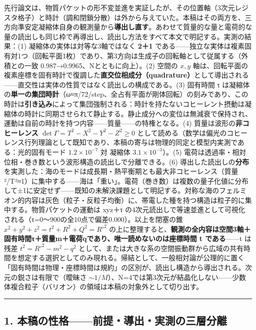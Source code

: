 \documentclass[
  a4paper,
]{ltjsarticle}
\begin{document}
先行論文は、物質パケットの形不変並進を実証したが、その位置軸（3次元レジスタ格子）と時計（調和閉鎖分散）は外から与えていた。本稿はその両方を、三方向準安定凝縮体自身の観測量から\textbf{導出し直す}。あわせて質量的な量と電荷的な量の読出しも同じ枠で再導出し、読出し方法をすべて本文で明記する。実測の結果：(1)
凝縮体の実体は対等な3軸ではなく \textbf{2＋1}
である------独立な実体は複素固有対1つ（回転平面1枚）であり、第3方向は生成子の回転軸として従属する（外積との一致
0.987→0.9965、Nとともに向上）。(2) 空間の \(x, y\)
軸は、回転平面の複素座標を固有時計で復調した\textbf{直交位相成分（quadrature）}として導出される------直交性は実体の性質ではなく読出しの構成である。(3)
固有時間 τ
は凝縮体の\textbf{単一の集団時計}（ω≈π/72/step、全占有平面が剛体回転）の刻みであり、この時計は\textbf{引き込み}によって集団強制される：時計を持たないコヒーレント摂動は凝縮体の時計に同期させられて静止する。静止成分への変位は無減衰で保持され、運動は自前の時計を持つ内容------質量------の特権となる。(4)
質量は波形の\textbf{非コヒーレンス}
\(\det\Gamma = T^2\!-\!X^2\!-\!Y^2\!-\!Z^2 \ge 0\)
として読める（数学は偏光のコヒーレンス行列理論として既知であり、本稿の寄与は物理的同定と模型内実測である：光的固有モード
\(1.2\times10^{-7}\) 対 凝縮体 \(3.1\times10^{-3}\)）。(5)
電荷は透過率・相対位相・巻き数という波形構造の読出しで分離できる。(6)
導出した読出しの\textbf{分布}を実測した：海のモードは成長期・熱平衡期とも最大非コヒーレンス（質量²/T²≈1）に集中する------海は「重い」。電荷（巻き数）は複数の量子化値に分布して±1に安定せず------既知の未解決課題として明記する。対称な海のフェルミオン的内容は灰色（粒子・反粒子均衡）に、帯電した種を持つ構造は粒子的に集中する。物質パケットの運動は
xyz＋τ
の4次元読出しで等速並進として可視化される（τ=0〜900の全10点で偏差0.000）。以上を閉塞の錐
\(x^2+y^2+z^2 = t^2+R^2+Q^2 = R'^2\)
の上に整理すると、\textbf{観測の全内容は空間3軸＋固有時間τ＋質量m＋電荷qであり、唯一読めないのは座標時間
t である}------t は残差 \(t^2 = R'^2 - m^2 - q^2\)
として、または大きな系の空間振動群から広域の共有時間を想定する選択としてのみ現れる。帰結として、一般相対論が公理的に置く「固有時間は物理・座標時間は規約」の区別が、読出し構造から導出される。次元の鋭さは有限で（曖昧さ
\(\sim 1/M\)）、N=4では第3次元が結晶化しない------少数体複合粒子（バリオン）の領域は本稿の対象外として切り出す。

\begin{center}\rule{0.5\linewidth}{0.5pt}\end{center}

\subsection{1.
本稿の性格------前提・導出・実測の三層分離}\label{ux672cux7a3fux306eux6027ux683cux524dux63d0ux5c0eux51faux5b9fux6e2cux306eux4e09ux5c64ux5206ux96e2}
\end{document}
